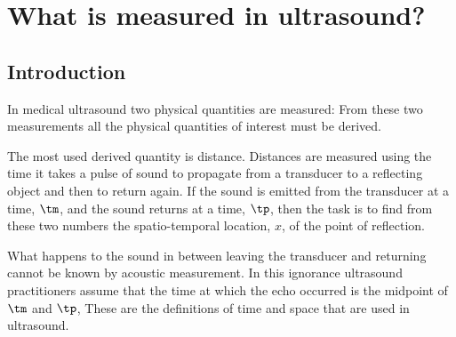 

\chapter{What is measured in ultrasound?}\label{ch:acousticSR}



\section{Introduction}\label{sec:measurement}


In medical ultrasound two physical quantities are measured:
From these two measurements all the physical quantities of interest must be derived.

The most used derived quantity is distance.
Distances are measured using the time it takes a pulse of sound to propagate from a transducer
to a reflecting object and then to return again. 
If the sound is emitted from the transducer at a time, $\tm$,
and the sound returns at a time,  $\tp$,
then the task is to find from these two numbers the spatio-temporal location, $x$,
of the point of reflection.

What happens to the sound in between leaving the transducer and returning
cannot be known by acoustic measurement.
In this ignorance ultrasound practitioners assume that the time at which the echo 
occurred is the midpoint of $\tm$ and $\tp$,
These are the definitions of time and space that are used in ultrasound.



